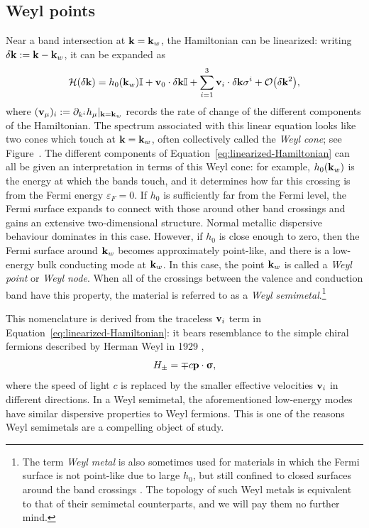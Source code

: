 \subsection{Weyl points}
Near a band intersection at $\vb{k}=\vb{k}_w$, the Hamiltonian can be linearized: writing $\delta\vb{k} := \vb{k} - \vb{k}_w$, it can be expanded as
\begin{equation}\label{eq:linearized-Hamiltonian}
	\Hc(\delta\k) = h_0(\k_w)\Id + \vb{v}_0\cdot\delta\k\Id + \sum_{i=1}^{3}\vb{v}_i\cdot\delta\k \sigma^i + \order{\delta\k^2},
\end{equation} %
where $(\vb{v}_\mu)_i := \partial_{k^i}h_\mu |_{\vb{k}=\vb{k}_w}$ records the rate of change of the different components of the Hamiltonian. The spectrum associated with this linear equation looks like two cones which touch at $\vb{k}=\vb{k}_w$, often collectively called the \emph{Weyl cone}; see Figure~. %
The different components of Equation~\eqref{eq:linearized-Hamiltonian} can all be given an interpretation in terms of this Weyl cone: for example, $h_0(\vb{k}_w)$ is the energy at which the bands touch, and it determines how far this crossing is from the Fermi energy $\varepsilon_F=0$. If $h_0$ is sufficiently far from the Fermi level, the Fermi surface expands to connect with those around other band crossings and gains an extensive two-dimensional structure. Normal metallic dispersive behaviour dominates in this case. However, if $h_0$ is close enough to zero, then the Fermi surface around $\vb{k}_w$ becomes approximately point-like, and there is a low-energy bulk conducting mode at $\vb{k}_w$. In this case, the point $\vb{k}_w$ is called a \emph{Weyl point} or \emph{Weyl node}. When all of the crossings between the valence and conduction band have this property, the material is referred to as a \emph{Weyl semimetal}.\footnote{
	The term \emph{Weyl metal} is also sometimes used for materials in which the Fermi surface is not point-like due to large $h_0$, but still confined to closed surfaces around the band crossings \cite{Burkov_Weyl-metals}. The topology of such Weyl metals is equivalent to that of their semimetal counterparts, and we will pay them no further mind.}

This nomenclature is derived from the traceless $\vb{v}_i$ term in Equation~\eqref{eq:linearized-Hamiltonian}: it bears resemblance to the simple chiral fermions described by Herman Weyl in 1929 \cite{Weyl_fermions},
\begin{equation*}
	H_\pm = \mp c\vb{p}\cdot\bm{\upsigma},
\end{equation*}
where the speed of light $c$ is replaced by the smaller effective velocities $\vb{v}_i$ in different directions. In a Weyl semimetal, the aforementioned low-energy modes have similar dispersive properties to Weyl fermions. This is one of the reasons Weyl semimetals are a compelling object of study.

